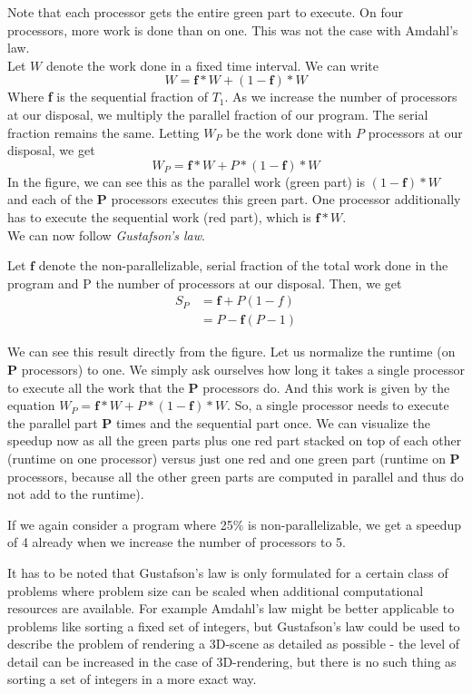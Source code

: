 \documentclass[main.tex]{subfiles}
\begin{document}
\noindent Note that each processor gets the entire green part to execute. On four processors, more work is done than on one. This was not the case with Amdahl's law.\\[3mm]
Let $W$ denote the work done in a fixed time interval. We can write
\begin{equation*}
    W = \mathbf{f} * W + (1 - \mathbf{f}) * W
\end{equation*}
Where \textbf{f} is the sequential fraction of $T_{1}$. As we increase the number of processors at our disposal, we multiply the parallel fraction of our program. The serial fraction remains the same. Letting $W_P$ be the work done with $P$ processors at our disposal, we get
\begin{equation*}
    W_P = \mathbf{f} * W + P * (1 - \mathbf{f}) * W
\end{equation*}
In the figure, we can see this as the parallel work (green part) is $(1-\mathbf{f}) * W$ and each of the \textbf{P} processors executes this green part. One processor additionally has to execute the sequential work (red part), which is $\mathbf{f}*W$.\\
We can now follow \textit{Gustafson's law}.
\begin{theorem}
    Let $\mathbf{f}$ denote the non-parallelizable, serial fraction of the total work done in the program and P the number of processors at our disposal. Then, we get
    \begin{align*}
        S_P &= \mathbf{f} + P(1-f)\\
            &= P - \mathbf{f}(P-1)
    \end{align*}
\end{theorem}
We can see this result directly from the figure. Let us normalize the runtime (on \textbf{P} processors) to one. We simply ask ourselves how long it takes a single processor to execute all the work that the \textbf{P} processors do. And this work is given by the equation $W_P = \mathbf{f} * W + P * (1 - \mathbf{f}) * W$. So, a single processor needs to execute the parallel part \textbf{P} times and the sequential part once. We can visualize the speedup now as all the green parts plus one red part stacked on top of each other (runtime on one processor) versus just one red and one green part (runtime on \textbf{P} processors, because all the other green parts are computed in parallel and thus do not add to the runtime).

If we again consider a program where 25\% is non-parallelizable, we get a speedup of 4 already when we increase the number of processors to 5.

It has to be noted that Gustafson's law is only formulated for a certain class of problems where problem size can be scaled when additional computational resources are available. For example Amdahl's law might be better applicable to problems like sorting a fixed set of integers, but Gustafson's law could be used to describe the problem of rendering a 3D-scene as detailed as possible - the level of detail can be increased in the case of 3D-rendering, but there is no such thing as sorting a set of integers in a more exact way.
\end{document}
